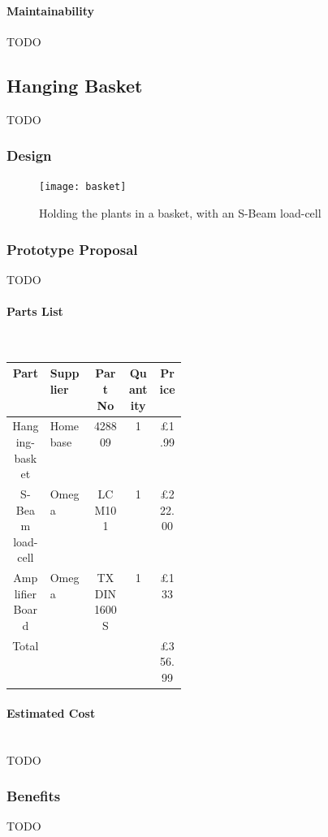 \documentclass[11pt]{article}
\begin{document}
\paragraph{Maintainability}
TODO

\subsection{Hanging Basket}
TODO
\subsubsection{Design}

\begin{figure}[H]
  \begin{center}
    \texttt{[image: basket]}
    \caption{Holding the plants in a basket, with an S-Beam load-cell}
  \end{center}
\end{figure}

\subsubsection{Prototype Proposal}
TODO
\paragraph{Parts List}\mbox{}\\

\begin{center}
  \begin{longtable}{||c |  p{0.25\linewidth}   |c | c | c||} 
    \hline
    Part & Supplier & Part No & Quantity & Price \\ [0.5ex] 
    \hline\hline
    Hanging-basket & Homebase & 428809 & 1 & \pounds1.99 \\
    \hline
    S-Beam load-cell & Omega & LCM101 & 1 & \pounds222.00 \\
    \hline
    Amplifier Board & Omega & TXDIN1600S & 1 & \pounds133 \\
    \hline
    \hline
    Total & & & & \pounds356.99 \\
    \hline
  \end{longtable}
\end{center}
\paragraph{Estimated Cost}\mbox{}\\
TODO
\subsubsection{Benefits}
TODO
\end{document}

